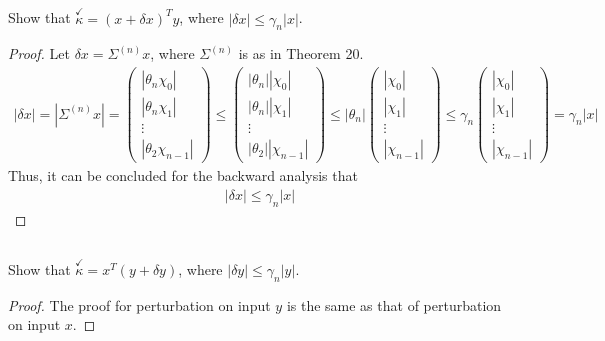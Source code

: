 \documentclass[11pt,a4paper]{article}
\begin{document}
\subsection{}
Show that $\overset{\checkmark}{\kappa} = (x + \delta x)^T y$, where $|\delta x| \leq \gamma_n |x|$. 
\begin{proof}
    Let $\delta x = \Sigma^{(n)} x$, where $\Sigma^{(n)}$ is as in Theorem 20.     
    \begin{align}
        |\delta x| = |\Sigma^{(n)} x| 
         = \left(\begin{array}{c} |\theta_n\chi_0| \\ |\theta_n\chi_1| \\ \vdots \\ |\theta_2\chi_{n-1}| \end{array} \right)
         \leq \left(\begin{array}{c} |\theta_n||\chi_0| \\ |\theta_n||\chi_1| \\ \vdots \\ |\theta_2||\chi_{n-1}| \end{array} \right)
         \leq |\theta_n| \left(\begin{array}{c} |\chi_0| \\ |\chi_1| \\ \vdots \\ |\chi_{n-1}| \end{array} \right)
         \leq \gamma_n \left(\begin{array}{c} |\chi_0| \\ |\chi_1| \\ \vdots \\ |\chi_{n-1}| \end{array} \right)
         = \gamma_n |x|
    \end{align}
    Thus, it can be concluded for the backward analysis that 
    \begin{align}
        |\delta x| \leq \gamma_n |x|
    \end{align}
\end{proof}

\subsection{}
Show that $\overset{\checkmark}{\kappa} = x^T (y+\delta y)$, where $|\delta y| \leq \gamma_n |y|$. 
\begin{proof}
    The proof for perturbation on input $y$ is the same as that of perturbation
    on input $x$.
\end{proof}
\end{document}
